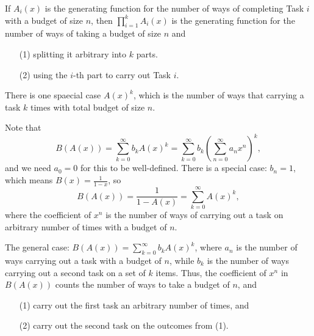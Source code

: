 \begin{prev}
    If \(A_i(x)\) is the generating function for the number of ways of completing Task \(i\) with a budget of size \(n\), then \(\prod _{i=1}^k A_i(x)\) is the generating function for the number of ways of taking a budget of size \(n\) and 
    \begin{itemize}
        \item [(1)] splitting it arbitrary into \(k\) parts. 
        \item [(2)] using the \(i\)-th part to carry out Task \(i\). 
    \end{itemize}      
    There is one spaecial case \(A(x)^k\), which is the number of ways that carrying a task \(k\) times with total budget of size \(n\). 
    
    Note that 
    \[
        B(A(x)) = \sum_{k=0}^{\infty} b_k A(x)^k = \sum_{k=0}^{\infty} b_k \left( \sum_{n=0}^{\infty} a_n x^n  \right)^k,   
    \] and we need \(a_0 = 0\) for this to be well-defined. There is a special case: \(b_n = 1\), which means \(B(x) = \frac{1}{1-x}\), so 
    \[
        B(A(x)) = \frac{1}{1-A(x)} =\sum_{k=0}^{\infty} A(x)^k, 
    \] where the coefficient of \(x^n\) is the number of ways of carrying out a task on arbitrary number of times with a budget of \(n\). 
    
    The general case: \(B(A(x)) = \sum_{k=0}^{\infty} b_k A(x)^k \), where \(a_n\) is the number of ways carrying out a task with a budget of \(n\), while \(b_k\) is the number of ways carrying out a second task on a set of \(k\) items. Thus, the coefficient of \(x^n\) in \(B(A(x))\) counts the number of ways to take a budget of \(n\), and 
    \begin{itemize}
        \item [(1)] carry out the first task an arbitrary number of times, and 
        \item [(2)] carry out the second task on the outcomes from (1).
    \end{itemize}        
\end{prev}

